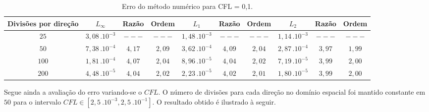 \documentclass[10pt,twoside,a4paper]{article}
\begin{document}
	\begin{table}[h!]
		\caption{Erro do método numérico para CFL = 0,1.}
		\label{tabela1}
		\centering
		\begin{tabular}{c | c c c | c c c | c c c}
			\hline
			Divisões por direção   &  $L_\infty$       	& Razão   	 & Ordem   & $L_{1}$ 				& Razão 	  & Ordem &  $L_{2}$       	& Razão   	 & Ordem \\ \hline
			
			
			
			$25$ 				   & $3,08 \, . 10^{-3}$      & $---$   &       $---$   & $1,48 \, . 10^{-3}$       & $---$    	&  $---$     & $1,14 \, . 10^{-3}$      & $---$   & $---$ \\ 
			
			
			$50$ 				  & $7,38 \, . 10^{-4}$      & $4,17$   &       $2,09$  & $3,62 \, . 10^{-4}$       & $4,09$   					&		$2,04$     & $2,87 \, . 10^{-4}$      & $3,97$   & $1,99$\\ 
			
			
			$100$ 				  & $1,81 \, . 10^{-4}$      & $4,07$   &       $2,04$  & $8,96 \, . 10^{-5}$       & $4,04$    		&		$2,02$     & $7,19 \, . 10^{-5}$      & $3,99$   & $2,00$\\ 
			
			
			$200$ 				   & $4,48 \, . 10^{-5}$      & $4,04$   &       $2,02$  & $2,23 \, . 10^{-5}$       & $4,02$    				&		$2, 01$     & $1,80 \, . 10^{-5}$      & $3,99$   & $2,00$\\
			 \hline
		\end{tabular}

	\end{table}
\vspace*{-2mm}
	
	Segue ainda a avaliação do erro variando-se o $CFL$. O número de divisões para cada direção no domínio espacial foi mantido constante em $50$ para o intervalo $CFL \in [2,5 \ .10^{-3} , 2,5 \ .10^{-1}]$. O resultado obtido é ilustrado à seguir.
	
\end{document}
